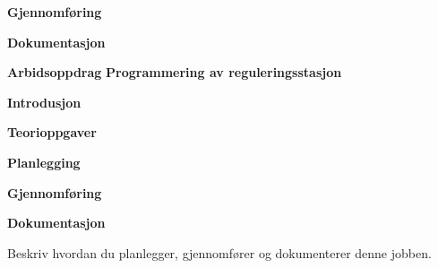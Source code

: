 \textbf{Gjennomføring}

\textbf{Dokumentasjon}

\vskip 5pt
\begin{center}
\textbf{Arbidsoppdrag}
\vskip 5pt 
\textbf{Programmering av reguleringsstasjon}
\end{center}

\vskip 10pt 
\textbf{Introdusjon}

\vskip 5pt 

\vskip 5pt 


\vskip 10pt 
\textbf{Teorioppgaver}

\vskip 5pt 

\vskip 10pt 
\textbf{Planlegging}


\vskip 10pt 
\textbf{Gjennomføring}

\vskip 10pt 
\textbf{Dokumentasjon}

Beskriv hvordan du planlegger, gjennomfører og dokumenterer denne jobben. 





















\vfil \eject

















